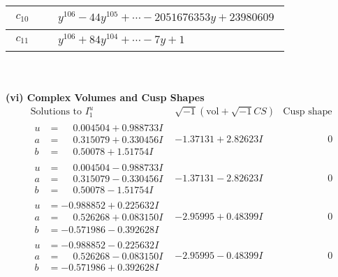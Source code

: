 \documentclass[1p]{elsarticle_modified}
\theoremstyle{definition}
\newcommand{\I}{\sqrt{-1}}
\begin{document}
\begin{tabular}{m{50pt}|m{274pt}}
\hline $$\begin{aligned}c_{10}\end{aligned}$$&$\begin{aligned}
&y^{106}-44 y^{105}+\cdots-2051676353 y+23980609
\end{aligned}$\\
\hline $$\begin{aligned}c_{11}\end{aligned}$$&$\begin{aligned}
&y^{106}+84 y^{104}+\cdots-7 y+1
\end{aligned}$\\
\hline
\end{tabular}\\~\\
\newpage\flushleft \textbf{(vi) Complex Volumes and Cusp Shapes}
$$\begin{array}{c|c|c}  
\text{Solutions to }I^u_{1}& \I (\text{vol} + \sqrt{-1}CS) & \text{Cusp shape}\\
 \hline 
\begin{aligned}
u &= \phantom{-}0.004504 + 0.988733 I \\
a &= \phantom{-}0.315079 + 0.330456 I \\
b &= \phantom{-}0.50078 + 1.51754 I\end{aligned}
 & -1.37131 + 2.82623 I & \phantom{-0.000000 } 0 \\ \hline\begin{aligned}
u &= \phantom{-}0.004504 - 0.988733 I \\
a &= \phantom{-}0.315079 - 0.330456 I \\
b &= \phantom{-}0.50078 - 1.51754 I\end{aligned}
 & -1.37131 - 2.82623 I & \phantom{-0.000000 } 0 \\ \hline\begin{aligned}
u &= -0.988852 + 0.225632 I \\
a &= \phantom{-}0.526268 + 0.083150 I \\
b &= -0.571986 - 0.392628 I\end{aligned}
 & -2.95995 + 0.48399 I & \phantom{-0.000000 } 0 \\ \hline\begin{aligned}
u &= -0.988852 - 0.225632 I \\
a &= \phantom{-}0.526268 - 0.083150 I \\
b &= -0.571986 + 0.392628 I\end{aligned}
 & -2.95995 - 0.48399 I & \phantom{-0.000000 } 0 \\ \hline\begin{aligned}

\end{aligned}
\end{array}$$
\end{document}
